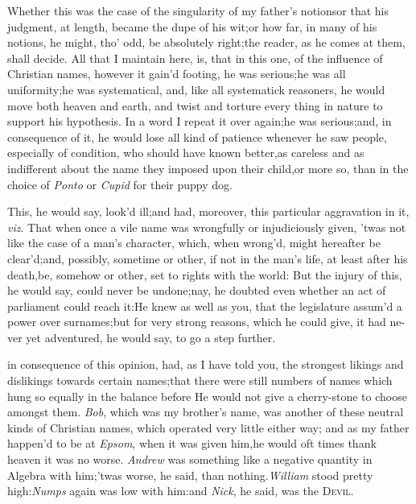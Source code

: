 \documentclass{article}
\begin{document}
Whether this was the case of the singularity of my
father’s notions\tsk  or that his judgment, at length,
became the dupe of his wit;\tsk  or how far, in many of his
notions, he might, tho’ odd, be absolutely right;\tsk  the
reader, as he comes at them, shall decide. All that I maintain
here, is, that in this one, of the influence of Christian names,
however it gain’d footing, he was serious;\tsk  he was all
uniformity;\tsk  he was systema\-tical, and, like all systematick
reasoners, he would move both heaven and earth, and twist and
torture every thing in nature to support his hypothesis. In a word
I repeat it over again;\tsk  he was
serious;\tsk  and, in consequence of it, he would lose all kind of
patience whenever he saw people, especially of condition, who
should have known better,\tsh  as careless and as
indifferent about the name they imposed upon their child,\tsk  or
more so, than in the choice of \textit{Ponto} or \textit{Cupid} for
their puppy dog.

This, he would say, look’d ill;\tsk  and had, moreover,
this particular aggravation in it, \textit{viz}. That when once a vile name
was wrongfully or injudiciously given, ’twas not like the
case of a man’s character, which, when wrong’d, might
hereafter be clear’d;\tsh  and, possibly, sometime or
other, if not in the man’s life, at least after his
death,\tsk  be, somehow or other, set to rights with the world:\break
But the injury of this, he would say, could never be
undone;\tsk  nay, he doubt\-ed even whether an act of parliament
could reach it:\tsh  He knew as well as you, that the
legislature assum’d a power over surnames;\tsk  but for very
strong reasons, which he could give, it had ne- ver yet adventured, he
would say, to go\break
a step further.

\noindent
{} in consequence of
this opinion, had, as I have told you, the strongest likings and
dislikings towards certain names;\tsk  that there were still
numbers of names which hung so equally in the balance before
He would not give a cherry-stone to\break
choose amongst them. \textit{Bob}, which was\break
my brother’s name, was another of these neutral kinds of
Christian names, which operated very little either way; and as my
father happen’d to be at \textit{Epsom}, when it was given him,\tsk  he would
oft times thank heaven it was no worse. \textit{Andrew} was something
like a negative quantity in Algebra with him;\tsk  ’twas
worse, he said, than nothing.\tsk  \textit{William} stood pretty
high:\tsh  \textit{Numps} again was low with him:\tsk  and
\textit{Nick}, he said, was the \textsc{Devil}.
\end{document}
